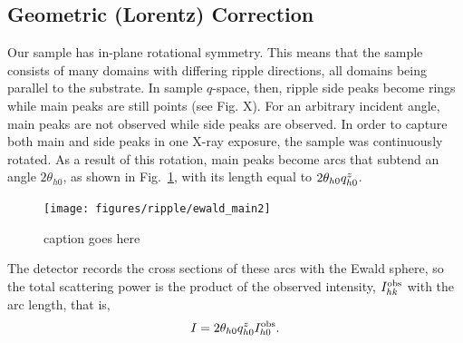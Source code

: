 \subsection{Geometric (Lorentz) Correction}\label{sec:Lorentz_correction}
Our sample has in-plane rotational symmetry. This means that the sample 
consists of many domains with differing ripple directions, all domains
being parallel to the substrate.  
In sample $q$-space, then, ripple side peaks become rings while main peaks are
still points (see Fig. X). For an arbitrary incident angle, main peaks are not observed
while side peaks are observed. 
In order to capture both main and side peaks in one X-ray exposure, 
the sample was continuously rotated. As a result of this rotation, 
main peaks become arcs that subtend an angle $2\theta_{h0}$,
as shown in Fig.~\ref{fig:ewald_main}, with its length
equal to $2\theta_{h0}q_{h0}^z$.  
\begin{figure}[htbp]
  \centering
  \texttt{[image: figures/ripple/ewald\_main2]}
  \caption{caption goes here}
  \label{fig:ewald_main}
\end{figure}
The detector records the cross sections of these arcs with the 
Ewald sphere, so the total scattering power is the product of the observed intensity,
$I_{hk}^\mathrm{obs}$ with the arc length, that is, 
\begin{equation}
  I = 2\theta_{h0}q_{h0}^z I_{h0}^\mathrm{obs}. \label{eq:main_ewald}
\end{equation}

